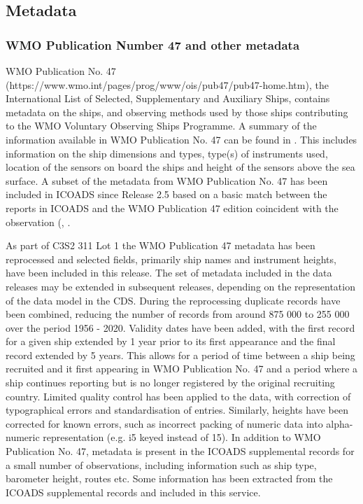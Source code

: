 \FloatBarrier
\subsection{Metadata}
\subsubsection{WMO Publication Number 47 and other metadata}
WMO Publication No. 47 (https://www.wmo.int/pages/prog/www/ois/pub47/pub47-home.htm), the International List of Selected, Supplementary and Auxiliary Ships, contains metadata on the ships, and observing methods used by those ships contributing to the WMO Voluntary Observing Ships Programme. 
A summary of the information available in WMO Publication No. 47 can be found in \cite{Kent2007}. 
This includes information on the ship dimensions and types, type(s) of instruments used, location of the sensors on board the ships and height of the sensors above the sea surface.  
A subset of the metadata from WMO Publication No. 47 has been included in ICOADS since Release 2.5 based on a basic match between the reports in ICOADS and the WMO Publication 47 edition coincident with the observation (\cite{Kent2007}, \cite{Woodruff2011}.

As part of C3S2 311 Lot 1 the WMO Publication 47 metadata has been reprocessed and selected fields, primarily ship names and instrument heights, have been included in this release. 
The set of metadata included in the data releases may be extended in subsequent releases, depending on the representation of the data model in the CDS.
During the reprocessing duplicate records have been combined, reducing the number of records from around 875 000 to 255 000 over the period 1956 - 2020. 
Validity dates have been added, with the first record for a given ship extended by 1 year prior to its first appearance and the final record extended by 5 years. 
This allows for a period of time between a ship being recruited and it first appearing in WMO Publication No. 47 and a period where a ship continues reporting but is no longer registered by the original recruiting country. 
Limited quality control has been applied to the data, with correction of typographical errors and standardisation of entries. 
Similarly, heights have been corrected for known errors, such as incorrect packing of numeric data into alpha-numeric representation (e.g. i5 keyed instead of 15). 
In addition to WMO Publication No. 47, metadata is present in the ICOADS supplemental records for a small number of observations, including information such as ship type, barometer height, routes etc. 
Some information has been extracted from the ICOADS supplemental records and included in this service.

